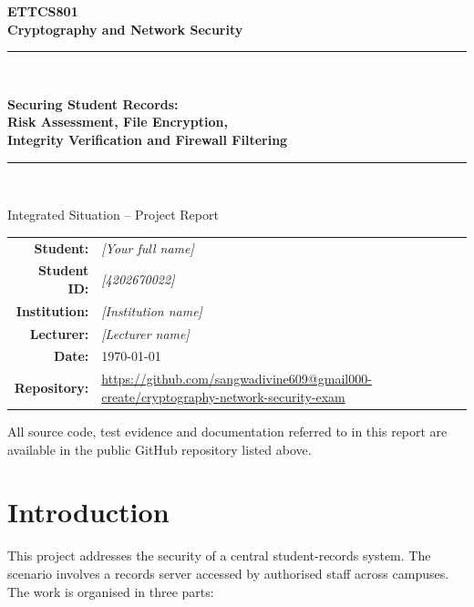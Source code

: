 \documentclass[11pt,a4paper]{article}
\begin{document}
\begin{titlepage}
\centering
\vspace*{2cm}
{\Large\bfseries ETTCS801\\[0.3cm] Cryptography and Network Security\par}
\vspace{1.2cm}
\rule{\textwidth}{1.2pt}\\[0.5cm]
{\Huge\bfseries Securing Student Records:\\[0.2cm]
Risk Assessment, File Encryption,\\[0.2cm]
Integrity Verification and Firewall Filtering\par}
\rule{\textwidth}{1.2pt}\\[1.5cm]

{\large Integrated Situation -- Project Report\par}
\vspace{2cm}

\begin{tabular}{rl}
  \textbf{Student:}     & \textit{[Your full name]} \\
  \textbf{Student ID:}  & \textit{[4202670022]} \\
  \textbf{Institution:} & \textit{[Institution name]} \\
  \textbf{Lecturer:}    & \textit{[Lecturer name]} \\
  \textbf{Date:}        & \today \\
  \textbf{Repository:}  & \url{https://github.com/sangwadivine609@gmail000-create/cryptography-network-security-exam}
\end{tabular}

\vfill
{\small All source code, test evidence and documentation referred to in this report
are available in the public GitHub repository listed above.\par}
\end{titlepage}

\tableofcontents
\newpage

\section{Introduction}
This project addresses the security of a central student-records system.
The scenario involves a records server accessed by authorised staff across
campuses. The work is organised in three parts:
\end{document}
